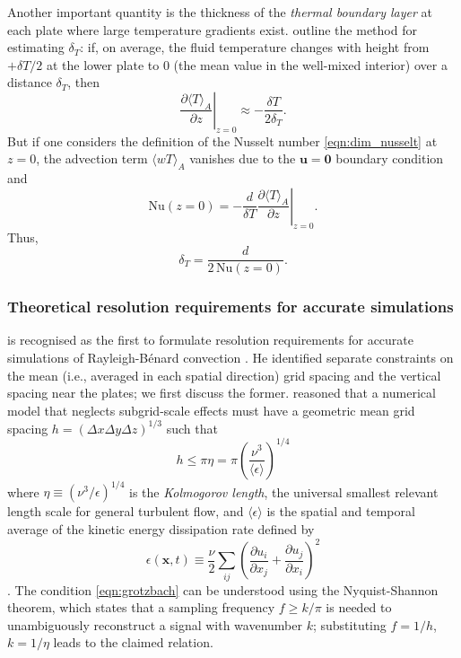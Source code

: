 \documentclass[titlepage]{article}
\numberwithin{equation}{section}
\newcommand{\pdiff}[2]{\frac{\partial #1}{\partial #2}}
\renewcommand\vec{\bm}
\newcommand{\nusselt}{\ensuremath{\mathrm{Nu}}}
\newcommand{\rb}{Rayleigh-B\'{e}nard}
\begin{document}
Another important quantity is the thickness of the \emph{thermal boundary
layer} at each plate where large temperature gradients exist.
\textcite{chilla2012} outline the method for estimating $\delta_T$: if, on
average, the fluid temperature changes with height from $+\delta T/2$ at the
lower plate to $0$ (the mean value in the well-mixed interior) over a distance
$\delta_T$, then
\[
    \left. \pdiff{\langle T \rangle_A}{z} \right|_{z=0}
        \approx -\frac{\delta T}{2 \delta_T}.
\]
But if one considers the definition of the Nusselt number
\cref{eqn:dim_nusselt} at $z=0$, the advection term $\langle wT \rangle_A$
vanishes due to the $\vec{u} = \vec{0}$ boundary condition and
\[
    \nusselt(z=0) = -\frac{d}{\delta T}
        \left. \pdiff{\langle T \rangle_A}{z} \right|_{z=0}.
\]
Thus,
\begin{equation}
    \label{eqn:thermal_bl}
    \delta_T = \frac{d}{2\,\nusselt(z=0)}.
\end{equation}

\subsubsection{Theoretical resolution requirements for accurate simulations}%
\label{sec:res_requirements}

\textcite{grotzbach1983} is recognised as the first to formulate resolution
requirements for accurate simulations of \rb{} convection
\parencite{chilla2012,scheel2013}. He identified separate constraints on the
mean (i.e., averaged in each spatial direction) grid spacing and the vertical
spacing near the plates; we first discuss the former.
\citeauthor{grotzbach1983} reasoned that a numerical model that neglects
subgrid-scale effects must have a geometric mean grid spacing $h = (\Delta x
\Delta y \Delta z)^{1/3}$ such that
\begin{equation}
    \label{eqn:grotzbach}
    h \leq \pi \eta = \pi \left(
        \frac{\nu^3}{\langle \epsilon \rangle}
    \right)^{1/4}
\end{equation}
where $\eta \equiv (\nu^3/\epsilon)^{1/4}$ is the \emph{Kolmogorov length}, the
universal smallest relevant length scale for general turbulent flow, and
$\langle \epsilon \rangle$ is the spatial and temporal average of the kinetic
energy dissipation rate defined by
\begin{equation}
    \label{eqn:kinetic_dissipation}
    \epsilon(\vec{x}, t) \equiv \frac{\nu}{2} \sum_{ij} \left(
        \pdiff{u_i}{x_j} + \pdiff{u_j}{x_i}
    \right)^2
\end{equation}
\parencite{chilla2012}. The condition \cref{eqn:grotzbach} can be
understood using the Nyquist-Shannon theorem, which states that a
sampling frequency $f \geq k/\pi$ is needed to unambiguously reconstruct
a signal with wavenumber $k$; substituting $f = 1/h$, $k = 1/\eta$ leads
to the claimed relation.
\end{document}
